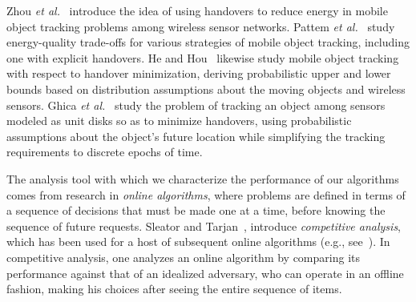 \documentclass[runningheads]{llncs}
\begin{document}
Zhou {\it et al.}~\cite{zjr-iddsc-02} introduce the idea of using
handovers to reduce energy in mobile object tracking problems among
wireless sensor networks.
Pattem {\it et al.}~\cite{ppk-eqttt-03} study energy-quality trade-offs
for various strategies of mobile object tracking, including one
with explicit handovers.
He and Hou~\cite{hh-ttqw-05} likewise study mobile object
tracking with respect to handover minimization, deriving probabilistic
upper and lower bounds based on distribution assumptions about 
the moving objects and wireless sensors.
Ghica {\it et al.}~\cite{gtzts-stpea-10} study the 
problem of tracking an object among sensors modeled as unit disks 
so as to minimize handovers,
using probabilistic assumptions about the object's future location while
simplifying the tracking requirements to discrete epochs of time.

The analysis tool with which we characterize the performance of our
algorithms comes from research in 
\emph{online algorithms}, where problems are defined 
in terms of a sequence of decisions that must be made one at a time, before knowing the sequence of future requests.
Sleator and Tarjan~\cite{st-aelup-85}, introduce
\emph{competitive analysis},
which has been used for
a host of subsequent online algorithms (e.g., see~\cite{be-occa-98}).
In competitive analysis, 
one analyzes an online algorithm by comparing its
performance against that
of an idealized adversary, who can 
operate in an offline fashion, making his choices after seeing the
entire sequence of items.
\end{document}
